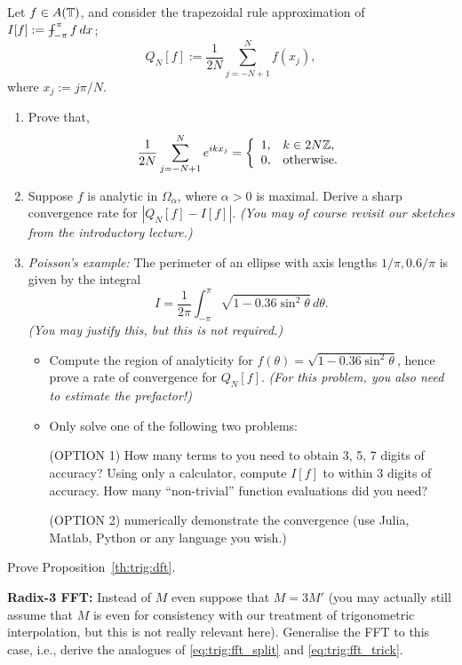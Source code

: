 \begin{exercise}
  \label{exr:trig:trapezoidal rule}
  Let $f \in A(\mathbb{T})$, and consider the trapezoidal rule approximation
  of $I[f] := \mint_{-\pi}^\pi f\,dx$;
  \[
    Q_N[f] := \frac{1}{2N} \sum_{j = -N+1}^N f(x_j),
  \]
  where $x_j := j\pi/N$.
  \begin{enumerate} \ilist
    \item Prove that,
    \[
        \frac{1}{2N} \sum_{j = -N+1}^N e^{ikx_j} =
          \left\{ \begin{array}{ll} 
              1, & k \in 2N \mathbb{Z}, \\
              0, & \text{otherwise.}
           \end{array} \right.
    \]

    \item Suppose $f$ is analytic in $\Omega_\alpha$, where $\alpha > 0$ is
    maximal. Derive a sharp convergence rate for $|Q_N[f] - I[f]|$.
    {\it (You may of course revisit our sketches from the introductory lecture.)}

    \item {\it Poisson's example: } The perimeter of an ellipse with axis
    lengths $1/\pi, 0.6/\pi$ is given by the integral
    \[
        I = \frac{1}{2\pi} \int_{-\pi}^\pi \sqrt{1 - 0.36 \sin^2\theta}\,d\theta.
    \]
    {\it (You may justify this, but this is not required.)}
    \begin{itemize}
      \item Compute the region of analyticity for $f(\theta) = \sqrt{1 - 0.36
      \sin^2\theta}$, hence prove a rate of convergence for $Q_N[f]$.
      {\it (For this problem, you also need to estimate the prefactor!)}
      \item Only solve one of the following two problems:

      (OPTION 1) How many terms to you need to obtain 3, 5, 7 digits of accuracy?
      Using only a calculator, compute $I[f]$ to within 3 digits of accuracy.
      How many ``non-trivial'' function evaluations did you need?

      (OPTION 2) numerically demonstrate the convergence (use Julia, Matlab, Python or any language you wish.) \qedhere
    \end{itemize}
  \end{enumerate}
\end{exercise}




\begin{exercise}
  Prove Proposition~\ref{th:trig:dft}.
\end{exercise}

\begin{exercise}
  {\bf Radix-3 FFT: } Instead of $M$ even suppose that $M = 3 M'$ (you may
  actually still assume that $M$ is even for consistency with our treatment of
  trigonometric interpolation, but this is not really relevant here). Generalise
  the FFT to this case, i.e., derive the analogues of \eqref{eq:trig:fft_split}
  and \eqref{eq:trig:fft_trick}.
\end{exercise}
